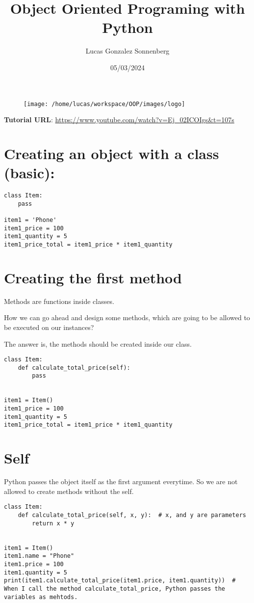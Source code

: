 \documentclass{article}
\begin{document}
\title{Object Oriented Programing with Python}
\date{05/03/2024}
\author{Lucas Gonzalez Sonnenberg}
\begin{figure}
	\centering
	\texttt{[image: /home/lucas/workspace/OOP/images/logo]}

\end{figure}

\maketitle
\tableofcontents
\pagebreak

\textbf{Tutorial URL}:
\url{https://www.youtube.com/watch?v=Ej_02ICOIgs&t=107s}

\section{Creating an object with a class (basic):}
\begin{lstlisting}
class Item:
	pass

item1 = 'Phone'
item1_price = 100
item1_quantity = 5
item1_price_total = item1_price * item1_quantity
\end{lstlisting}

\section{Creating the first method}
Methods are functions inside classes.

How we can go ahead and design some methods, which are going to be allowed to be executed on our instances?

The answer is, the methods should be created inside our class.

\begin{lstlisting}
class Item:
	def calculate_total_price(self):
		pass
	
	
item1 = Item()
item1_price = 100
item1_quantity = 5
item1_price_total = item1_price * item1_quantity
\end{lstlisting}

\section{Self}
Python passes the object itself as the first argument everytime. So we are not allowed to create methods without the self. 

\begin{lstlisting}
class Item:
	def calculate_total_price(self, x, y):  # x, and y are parameters
		return x * y


item1 = Item()
item1.name = "Phone"
item1.price = 100
item1.quantity = 5
print(item1.calculate_total_price(item1.price, item1.quantity))  # When I call the method calculate_total_price, Python passes the variables as mehtods.
\end{lstlisting}
\end{document}
